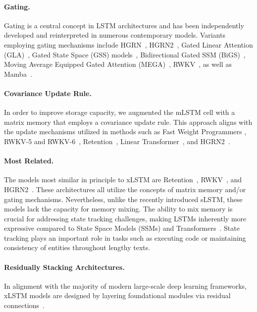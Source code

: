 \paragraph{Gating.}
Gating is a central concept in LSTM architectures and has been independently developed and reinterpreted in numerous contemporary models. Variants employing gating mechanisms include HGRN~\citep{Qin:23}, HGRN2~\citep{Qin:24arxiv}, Gated Linear Attention (GLA)~\citep{Yang:23arxiv}, Gated State Space (GSS) models~\citep{Mehta:22}, Bidirectional Gated SSM (BiGS)~\citep{Wang:22}, Moving Average Equipped Gated Attention (MEGA)~\citep{Ma:22}, RWKV~\citep{Peng:23arxivshort}, as well as Mamba~\citep{Gu:24arxiv}.

\paragraph{Covariance Update Rule.} In order to improve storage capacity, we augmented the mLSTM cell with a matrix memory that employs a covariance update rule. This approach aligns with the update mechanisms utilized in methods such as Fast Weight Programmers \citep{Schmidhuber:92ncfastweights,Schlag:21}, RWKV-5 and RWKV-6~\citep{Peng:24arxivshort}, Retention~\citep{Sun:23arxiv}, Linear Transformer~\citep{Katharopoulos:20}, and HGRN2~\citep{Qin:24arxiv}.

\paragraph{Most Related.} The models most similar in principle to xLSTM are Retention~\citep{Sun:23arxiv}, RWKV~\citep{Peng:23arxivshort,Peng:24arxivshort}, and HGRN2~\citep{Qin:24arxiv}. These architectures all utilize the concepts of matrix memory and/or gating mechanisms. Nevertheless, unlike the recently introduced sLSTM, these models lack the capacity for memory mixing. The ability to mix memory is crucial for addressing state tracking challenges, making LSTMs inherently more expressive compared to State Space Models (SSMs) and Transformers~\citep{Merrill:24,Deletang:23}. State tracking plays an important role in tasks such as executing code or maintaining consistency of entities throughout lengthy texts.

\paragraph{Residually Stacking Architectures.} In alignment with the majority of modern large-scale deep learning frameworks, xLSTM models are designed by layering foundational modules via residual connections~\citep{Srivastava:15,He:16}.

